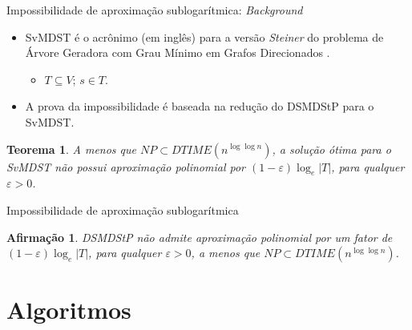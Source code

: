 \documentclass[10pt]{beamer}
\newtheorem{claim}{Afirmação}
\newtheorem{teorema}[theorem]{Teorema}
\begin{document}
\begin{frame}{Impossibilidade de aproximação sublogarítmica: \emph{Background}}
  \begin{itemize}
    \item SvMDST é o acrônimo (em inglês) para a versão \emph{Steiner} do problema de Árvore Geradora com Grau Mínimo em Grafos Direcionados \cite{Fraigniaud2001}.
    \begin{itemize}
      \item $T \subseteq V$; $s \in T$.
    \end{itemize}
    \item A prova da impossibilidade é baseada na redução do DSMDStP para o SvMDST.
  \end{itemize}

  \begin{teorema}
    \label{teorema:steiner_mdst}
    \cite{Fraigniaud2001}
    A menos que $NP \subset DTIME(n^{\log \log{n}})$, a solução ótima para o SvMDST não possui aproximação polinomial por $(1-\varepsilon)\log_e |T|$, para qualquer $\varepsilon > 0$.
  \end{teorema}
  \hyperlink{DTIME_slide}{}
  \hypertarget{DTIME}{}
\end{frame}

\begin{frame}{Impossibilidade de aproximação sublogarítmica}
  \begin{claim}
    \label{claim:not_approximable}
    DSMDStP não admite aproximação polinomial por um fator de 
$(1-\varepsilon)\log_e |T|$, para qualquer $\varepsilon > 0$, a menos que $NP \subset DTIME(n^{\log \log{n}})$.
  \end{claim}
\hypertarget{not_approximable}{}
\hyperlink{not_approximable_slide}{}
\end{frame}

\section{Algoritmos}
\end{document}
